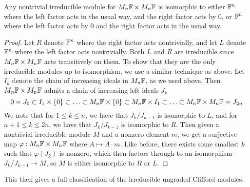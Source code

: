 %
\begin{thm}
 Any nontrivial irreducible module for $M_n\mathbb{F} \times M_n\mathbb{F}$ is isomorphic to
 either $\mathbb{F}^n$ where the left factor acts in the usual way, and the right factor
 acts by $0$, or $\mathbb{F}^n$ where the left factor acts by $0$ and the right factor
 acts in the usual way.
\end{thm}
%
\begin{proof}
 Let $R$ denote $\mathbb{F}^n$ where the right factor acts nontrivially, and let $L$
 denote $\mathbb{F}^n$ where the left factor acts nontrivially. Both $L$ and $R$ are
 irreducible since $M_n\mathbb{F} \times M_n\mathbb{F}$ acts transitively on them. To show
 that they are the only irreducible modules up to isomorphism, we use a similar
 technique as above. Let $I_k$ denote the chain of increasing ideals in $M_n\mathbb{F}$,
 as we used above. Then $M_n\mathbb{F} \times M_n\mathbb{F}$ admits a chain of increasing left
 ideals $J_k$
 \[
  0 = J_0 \subset I_1 \times \left\lbrace 0 \right\rbrace \subset \ldots \subset M_n\mathbb{F} \times \left\lbrace 0 \right\rbrace
  \subset M_n\mathbb{F} \times I_1 \subset \ldots \subset M_n\mathbb{F} \times M_n\mathbb{F} = J_{2n}
 \]
 We note that for $1 \leq k \leq n$, we have that $J_k / J_{k-1}$ is isomorphic to
 $L$, and for $n+1 \leq k \leq 2n$, we have that $J_k / J_{k-1}$ is isomorphic to
 $R$. Then given a nontrivial irreducible module $M$ and a nonzero element $m$,
 we get a surjective map $\varphi : M_n\mathbb{F} \times M_n\mathbb{F}$ where $A \mapsto A\cdot m$.
 Like before, there exists some smallest $k$ such that $\varphi(J_k)$ is nonzero,
 which then factors through to an isomorphism $J_k / J_{k-1} \to M$, so $M$
 is either isomorphic to $R$ or $L$.
\end{proof}
%
This then gives a full classification of the irreducible ungraded Clifford
modules.\\

